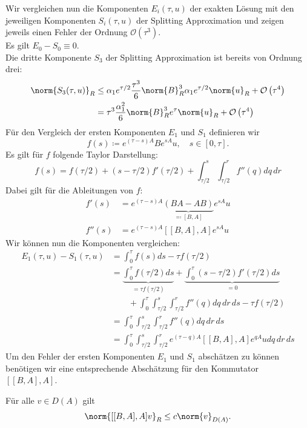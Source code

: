 Wir vergleichen nun die Komponenten $E_i(\tau,u)$ der exakten Lösung mit den jeweiligen Komponenten $S_i(\tau,u)$ der Splitting Approximation und zeigen jeweils einen Fehler der Ordnung $\mathcal{O}\left(\tau^3\right)$.\\
Es gilt $E_0-S_0\equiv 0$.\\
Die dritte Komponente $S_3$ der Splitting Approximation ist bereits von Ordnung drei:
\begin{align*}
\norm{S_3(\tau,u)}_R&\le \alpha_1e^{\tau/2}\frac{\tau^3}{6}\norm{B}^3_R\alpha_1e^{\tau/2}\norm{u}_R+\mathcal{O}\left(\tau^4\right)\\
&= \tau^3\frac{\alpha_1^2}{6}\norm{B}^3_Re^\tau\norm{u}_R+\mathcal{O}\left(\tau^4\right)
\end{align*}
Für den Vergleich der ersten Komponenten $E_1$ und $S_1$ definieren wir
\[f(s)\coloneqq e^{(\tau - s)A}Be^{sA}u,\quad s\in[0,\tau].\]
Es gilt für $f$ folgende Taylor Darstellung:
\[f(s)=f(\tau/2)+(s-\tau/2)f'(\tau/2)+\int_{\tau/2}^s\int_{\tau/2}^rf''(q)dq\,dr\]
Dabei gilt für die Ableitungen von $f$:
\begin{align*}
f'(s)&=e^{(\tau -s)A}\underbrace{(BA-AB)}_{\eqqcolon [B,A]}e^{sA}u\\
f''(s)&=e^{(\tau -s)A}[[B,A],A]e^{sA}u
\end{align*}
Wir können nun die Komponenten vergleichen:
\begin{align}
E_1(\tau,u)-S_1(\tau,u)&=\int_0^\tau f(s)ds-\tau f(\tau/2)\nonumber\\
&=\underbrace{\int_0^\tau f(\tau/2)ds}_{=\tau f(\tau/2)}+\underbrace{\int_0^\tau (s-\tau/2)f'(\tau/2)ds}_{=0}\nonumber\\
&\qquad+\int_0^\tau\int_{\tau/2}^s\int_{\tau/2}^rf''(q)dq\,dr\,ds-\tau f(\tau/2)\nonumber\\
&=\int_0^\tau\int_{\tau/2}^s\int_{\tau/2}^r f''(q)dq\,dr\,ds\nonumber\\
&=\int_0^\tau\int_{\tau/2}^s\int_{\tau/2}^r e^{(\tau -q)A}[[B,A],A]e^{qA}udq\,dr\,ds\label{eqn:order_first_components}
\end{align}
Um den Fehler der ersten Komponenten $E_1$ und $S_1$ abschätzen zu können benötigen wir eine entsprechende Abschätzung für den Kommutator $[[B,A],A]$.
\begin{mathlemma}[Kommutatorabschätzung]
\label{lemma:commutator}
Für alle $v\in D(A)$ gilt
\[\norm{[[B,A],A]v}_R\le c\norm{v}_{D(A)}.\]
\end{mathlemma}
